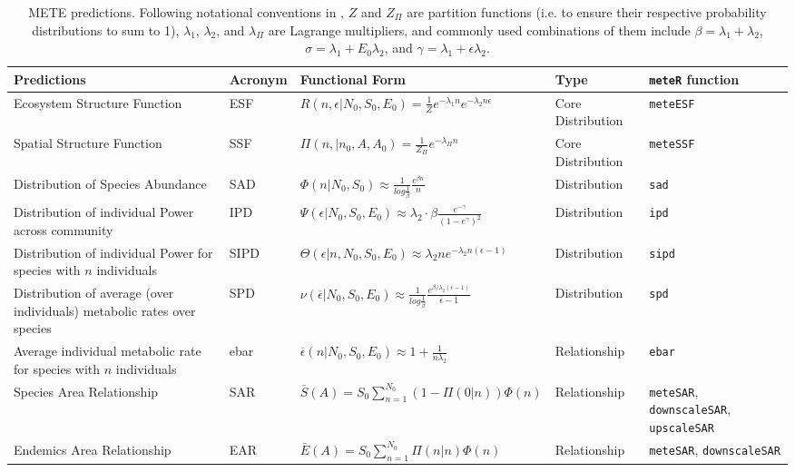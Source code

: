 \begin{table}[H]
\caption[METE predictions]{METE predictions. Following notational
  conventions in \citet{Harte:2011ut}, $Z$ and $Z_{\Pi}$ are partition
  functions (i.e. to ensure their respective probability distributions
  to sum to 1), $\lambda_1$, $\lambda_2$, and $\lambda_\Pi$ are
  Lagrange multipliers, and commonly used combinations of them include
  $\beta = \lambda_1 + \lambda_2$, $\sigma = \lambda_1 +
  E_0\lambda_2$, and $\gamma=\lambda_{1} + \epsilon \lambda_{2}$.} 
\label{tab:metrics}
\small
\begin{tabular}{p{4cm} p{1.1cm} p{5.5cm} p{2cm} p{2cm}}
  \hline
 Predictions & Acronym & Functional Form & Type & \texttt{meteR} function\\ 
  \hline
      Ecosystem Structure Function & ESF & $R(n,\epsilon | N_0, S_0,E_0) = \frac{1}{Z} e^{-\lambda_1n} e^{-\lambda_2n\epsilon}$  & Core Distribution & \texttt{meteESF} \\ 
	Spatial Structure Function & SSF & $\Pi(n,|n_0, A, A_0) = \frac{1}{Z_\Pi} e^{-\lambda_\Pi n}$& Core Distribution & \texttt{meteSSF} \\
	Distribution of Species Abundance & SAD & $\Phi(n|N_0, S_0)\approx \frac{1}{log\frac{1}{\beta}} \frac{e^{\beta n}}{n}$ & Distribution & \texttt{sad} \\ 
 	Distribution of individual Power across community & IPD & $\Psi(\epsilon|N_0, S_0, E_0)\approx  \lambda_2 \cdot \beta \frac{e^{-\gamma}}{(1-e^{\gamma})^2} $& Distribution & \texttt{ipd} \\
	Distribution of individual Power for species with $n$ individuals & SIPD & $\Theta(\epsilon | n,N_0, S_0, E_0)\approx \lambda_2ne^{-\lambda_2n(\epsilon-1)}$ & Distribution & \texttt{sipd} \\
	Distribution of average (over individuals) metabolic rates over species & SPD & $\nu (\overline{\epsilon} |  N_0, S_0,E_0) \approx \frac{1}{log\frac{1}{\beta}}  \frac{e^{\beta / \lambda_2(\overline{\epsilon} -1)}}{\overline{\epsilon} -1}$ & Distribution & \texttt{spd} \\
	Average individual metabolic rate for species with $n$ individuals & ebar & $\overline{\epsilon}(n | N_0, S_0,E_0) \approx 1 + \frac{1}{n\lambda_2}$ & Relationship & \texttt{ebar} \\
	Species Area Relationship & SAR & $\bar{S}(A) = S_0 \sum_{n=1}^{N_0} \left(1 - \Pi(0 | n)\right) \Phi(n)$ & Relationship & \texttt{meteSAR}, \verb|downscaleSAR|, \verb|upscaleSAR| \\
	Endemics Area Relationship & EAR & $\bar{E}(A) = S_0 \sum_{n=1}^{N_0} \Pi(n | n) \Phi(n)$ & Relationship & \verb|meteSAR|, \verb|downscaleSAR| \\
   \hline
\end{tabular}
\end{table}


